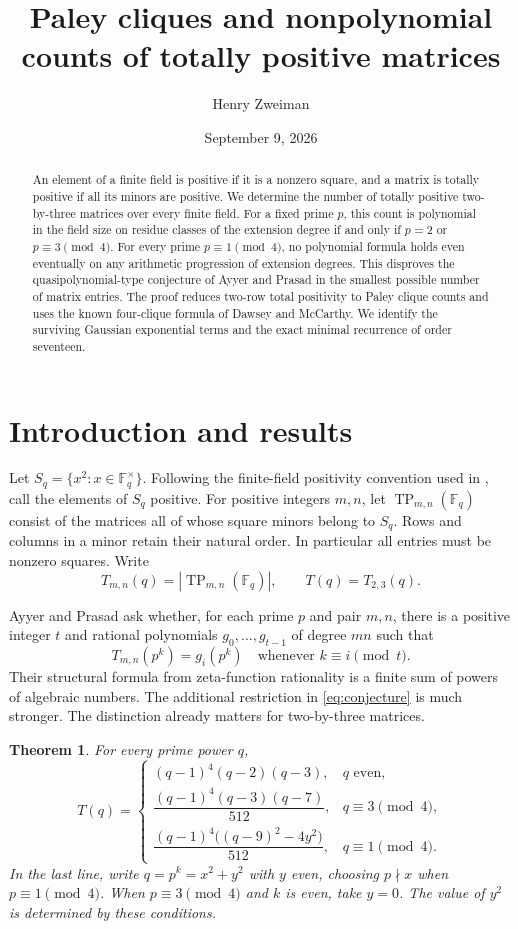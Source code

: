\documentclass[11pt]{article}
\title{Paley cliques and nonpolynomial counts of totally positive matrices}
\author{Henry Zweiman}
\date{September 9, 2026}
\newtheorem{theorem}{Theorem}
\newcommand{\F}{\mathbb F}
\newcommand{\TP}{\operatorname{TP}}
\begin{document}
\maketitle
\begin{abstract}
An element of a finite field is positive if it is a nonzero square, and a matrix is totally positive if all its minors are positive. We determine the number of totally positive two-by-three matrices over every finite field. For a fixed prime $p$, this count is polynomial in the field size on residue classes of the extension degree if and only if $p=2$ or $p\equiv3\pmod4$. For every prime $p\equiv1\pmod4$, no polynomial formula holds even eventually on any arithmetic progression of extension degrees. This disproves the quasipolynomial-type conjecture of Ayyer and Prasad in the smallest possible number of matrix entries. The proof reduces two-row total positivity to Paley clique counts and uses the known four-clique formula of Dawsey and McCarthy. We identify the surviving Gaussian exponential terms and the exact minimal recurrence of order seventeen.
\end{abstract}

\section{Introduction and results}
Let $S_q=\{x^2:x\in\F_q^\times\}$. Following the finite-field positivity convention used in \cite{AP}, call the elements of $S_q$ positive. For positive integers $m,n$, let $\TP_{m,n}(\F_q)$ consist of the matrices all of whose square minors belong to $S_q$. Rows and columns in a minor retain their natural order. In particular all entries must be nonzero squares. Write
\[
 T_{m,n}(q)=|\TP_{m,n}(\F_q)|,\qquad T(q)=T_{2,3}(q).
\]

Ayyer and Prasad \cite[Conjecture~5.12]{AP} ask whether, for each prime $p$ and pair $m,n$, there is a positive integer $t$ and rational polynomials $g_0,\ldots,g_{t-1}$ of degree $mn$ such that
\begin{equation}\label{eq:conjecture}
 T_{m,n}(p^k)=g_i(p^k)\quad\text{whenever }k\equiv i\pmod t.
\end{equation}
Their structural formula from zeta-function rationality is a finite sum of powers of algebraic numbers. The additional restriction in \eqref{eq:conjecture} is much stronger. The distinction already matters for two-by-three matrices.

\begin{theorem}\label{thm:count}
For every prime power $q$,
\begin{equation}\label{eq:count}
 T(q)=
 \begin{cases}
 (q-1)^4(q-2)(q-3),&q\text{ even},\\[3pt]
 \dfrac{(q-1)^4(q-3)(q-7)}{512},&q\equiv3\pmod4,\\[7pt]
 \dfrac{(q-1)^4\big((q-9)^2-4y^2\big)}{512},&q\equiv1\pmod4.
 \end{cases}
\end{equation}
In the last line, write $q=p^k=x^2+y^2$ with $y$ even, choosing $p\nmid x$ when $p\equiv1\pmod4$. When $p\equiv3\pmod4$ and $k$ is even, take $y=0$. The value of $y^2$ is determined by these conditions.
\end{theorem}
\end{document}
